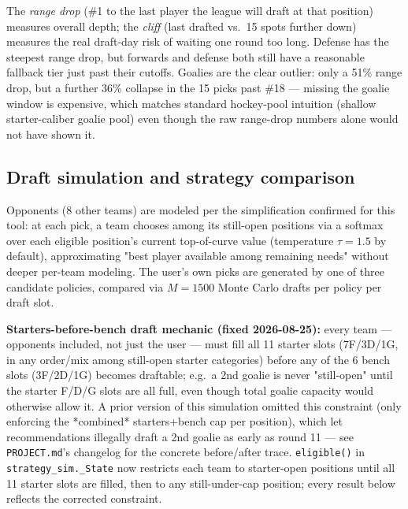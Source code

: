 \documentclass[11pt, a4paper]{article}
\begin{document}
The \emph{range drop} (\#1 to the last player the league will draft at that position) measures
overall depth; the \emph{cliff} (last drafted vs.\ 15 spots further down) measures the real
draft-day risk of waiting one round too long. Defense has the steepest range drop, but forwards
and defense both still have a reasonable fallback tier just past their cutoffs. Goalies are the
clear outlier: only a 51\% range drop, but a further 36\% collapse in the 15 picks past \#18 —
missing the goalie window is expensive, which matches standard hockey-pool intuition (shallow
starter-caliber goalie pool) even though the raw range-drop numbers alone would not have shown it.

\subsection{Draft simulation and strategy comparison}

Opponents (8 other teams) are modeled per the simplification confirmed for this tool: at each
pick, a team chooses among its still-open positions via a softmax over each eligible position's
current top-of-curve value (temperature $\tau=1.5$ by default), approximating "best player
available among remaining needs" without deeper per-team modeling. The user's own picks are
generated by one of three candidate policies, compared via $M=1500$ Monte Carlo drafts per
policy per draft slot.

\textbf{Starters-before-bench draft mechanic (fixed 2026-08-25):} every team — opponents included,
not just the user — must fill all 11 starter slots (7F/3D/1G, in any order/mix among still-open
starter categories) before any of the 6 bench slots (3F/2D/1G) becomes draftable; e.g.\ a 2nd
goalie is never "still-open" until the starter F/D/G slots are all full, even though total goalie
capacity would otherwise allow it. A prior version of this simulation omitted this constraint
(only enforcing the *combined* starters+bench cap per position), which let recommendations
illegally draft a 2nd goalie as early as round 11 — see \texttt{PROJECT.md}'s changelog for the
concrete before/after trace. \texttt{eligible()} in \texttt{strategy\_sim.\_State} now restricts
each team to starter-open positions until all 11 starter slots are filled, then to any
still-under-cap position; every result below reflects the corrected constraint.
\end{document}
